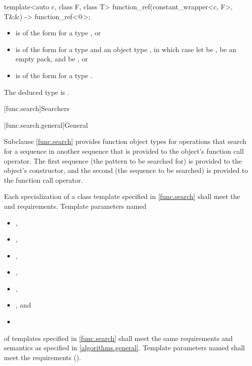 \begin{itemdecl}
template<auto c, class F, class T>
  function_ref(constant_wrapper<c, F>, T&&) -> function_ref<@\seebelow@>;
\end{itemdecl}

\begin{itemdescr}
\pnum
\constraints
\begin{itemize}
\item
{} is of the form
 for a type , or
\item
{} is of the form
 for a type  and an object type ,
in which case
let  be ,
 be an empty pack, and
 be , or
\item
{} is of the form
 for a type .
\end{itemize}

\pnum
\remarks
The deduced type is .
\end{itemdescr}

[func.search]{Searchers}

[func.search.general]{General}

\pnum
Subclause \ref{func.search} provides function object types for
operations that search for a sequence  in another
sequence  that is provided to the object's function call
operator.  The first sequence (the pattern to be searched for) is provided to
the object's constructor, and the second (the sequence to be searched) is
provided to the function call operator.

\pnum
Each specialization of a class template specified in \ref{func.search}
shall meet the  and  requirements.
Template parameters named
\begin{itemize}
\item {},
\item {},
\item {},
\item {},
\item {},
\item {}, and
\item {}
\end{itemize}
of templates specified in
\ref{func.search} shall meet the same requirements and semantics as
specified in \ref{algorithms.general}.
Template parameters named  shall meet the 
requirements ().

